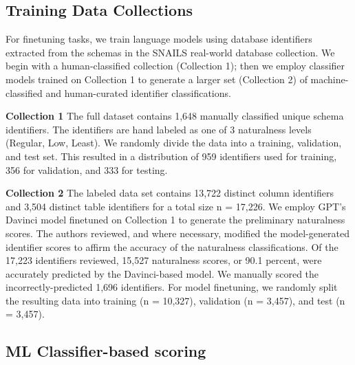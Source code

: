 \subsection{Training Data Collections}

For finetuning tasks, we train language models using database identifiers extracted from the schemas in the SNAILS real-world database collection.
We begin with a human-classified collection (Collection 1); then we employ classifier models trained on Collection 1 to generate a larger set (Collection 2) of machine-classified and human-curated identifier classifications.

\textbf{Collection 1} The full dataset contains 1,648 manually classified unique schema identifiers. The identifiers are hand labeled as one of 3 naturalness levels (Regular, Low, Least). We randomly divide the data into a training, validation, and test set. This resulted in a distribution of 959 identifiers used for training, 356 for validation, and 333 for testing. 

\textbf{Collection 2} The labeled data set contains 13,722 distinct column identifiers and 3,504 distinct table identifiers for a total size n = 17,226. 
We employ GPT's Davinci model finetuned on Collection 1 to generate the preliminary naturalness scores.
The authors reviewed, and where necessary, modified the model-generated identifier scores to affirm the accuracy of the naturalness classifications.
Of the 17,223 identifiers reviewed, 15,527 naturalness scores, or 90.1 percent, were accurately predicted by the Davinci-based model.
We manually scored the incorrectly-predicted 1,696 identifiers.
For model finetuning, we randomly split the resulting data into training (n = 10,327), validation (n = 3,457), and test (n = 3,457).

\subsection{ML Classifier-based scoring}

